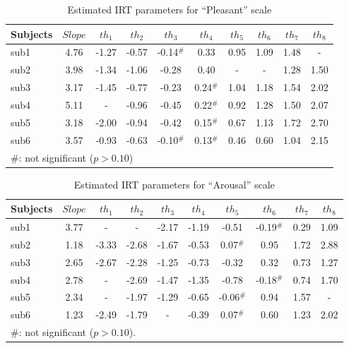 \documentclass[fonts]{icst}
\begin{document}
\begin{table*}[tb]
  \begin{center}
     \caption{Estimated IRT parameters for ``Pleasant'' scale}
   \label{tbl:irt_p}
\small
\begin{tabular}{|l|c|c|c|c|c|c|c|c|c|}
\hline
Subjects & $Slope$ & $th_1$ & $th_2$ & $th_3$ & $th_4$ & $th_5$ & $th_6$ & $th_7$ & $th_8$ \\
\hline \hline
sub1 & 4.76 & -1.27 & -0.57 & -0.14$^{\#}$ & 0.33 & 0.95 & 1.09 & 1.48
				 & - \\
sub2 & 3.98 & -1.34 & -1.06 & -0.28 & 0.40 & -  & - & 1.28 & 1.50 \\
sub3 & 3.17 & -1.45 & -0.77 & -0.23 & 0.24$^{\#}$ & 1.04 & 1.18 & 1.54
				 & 2.02 \\
sub4 & 5.11 & - & -0.96 & -0.45 & 0.22$^{\#}$ & 0.92 & 1.28 & 1.50 & 2.07 \\
sub5 & 3.18 & -2.00 & -0.94 & -0.42 & 0.15$^{\#}$ & 0.67 & 1.13 & 1.72 & 2.70 \\
sub6 & 3.57 & -0.93 & -0.63 & -0.10$^{\#}$ & 0.13$^{\#}$ & 0.46 & 0.60 & 1.04 &
				     2.15 \\
\hline
\multicolumn{9}{l}{\#: not significant ($p>0.10$)}
\end{tabular}
\end{center}
\end{table*}

\begin{table*}[tb]
  \begin{center}
     \caption{Estimated IRT parameters for ``Arousal'' scale}
   \label{tbl:irt_a}
\small
\begin{tabular}{|l|c|c|c|c|c|c|c|c|c|}
\hline
Subjects & $Slope$ & $th_1$ & $th_2$ & $th_3$ & $th_4$ & $th_5$ & $th_6$ & $th_7$ & $th_8$ \\
\hline \hline
sub1 & 3.77 & - & - & -2.17 & -1.19 & -0.51 & -0.19$^{\#}$ & 0.29 & 1.09 \\
sub2 & 1.18 & -3.33 & -2.68 & -1.67 & -0.53 & 0.07$^{\#}$ & 0.95 & 1.72  & 2.88 \\
sub3 & 2.65 & -2.67 & -2.28 & -1.25 & -0.73 & -0.32 & 0.32 & 0.73
				 & 1.27 \\
sub4 & 2.78 & - & -2.69 & -1.47 & -1.35 & -0.78 & -0.18$^{\#}$ & 0.74 & 1.70 \\
sub5 & 2.34 & - & -1.97 & -1.29 & -0.65 & -0.06$^{\#}$ & 0.94 & 1.57 & -  \\
sub6 & 1.23 & -2.49 & -1.79 &-  & -0.39 & 0.07$^{\#}$ & 0.60 & 1.23 & 2.02 \\
\hline
\multicolumn{9}{l}{\#: not significant ($p>0.10$).}
\end{tabular}
\end{center}
\end{table*}
\end{document}
